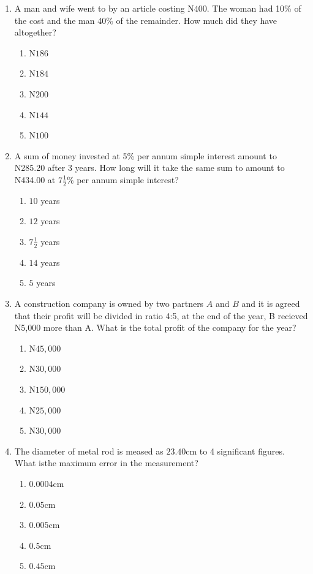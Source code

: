 \begin{multicols}{2}
\begin{enumerate}[label={\arabic*.}]
\begin{enumerate}[label={\Alph*.}]
    \end{enumerate}
\item A man and wife went to by an article costing N\(400\). The woman had 10\% of the cost and the man 40\% of the remainder. How much did they have altogether?
    \begin{enumerate}[label={\Alph*.}]
    \item N\(186\)
    \item N\(184\)
    \item N\(200\)
    \item N\(144\)
    \item N\(100\)

    \end{enumerate}
\item A sum of money invested at 5\% per annum simple interest amount to N285.20 after 3 years. How long will it take the same sum to amount to N434.00 at 7\(\frac{1}{2}\)\% per annum simple interest?
    \begin{enumerate}[label={\Alph*.}]
    \item \(10\) years
    \item \(12\) years
    \item \(7\frac{1}{2}\) years
    \item \(14\) years
    \item \(5\) years

    \end{enumerate}
\item A construction company is owned by two partners \(A\) and \(B\) and it is agreed that their profit will be divided in ratio 4:5, at the end of the year, B recieved N5,000 more than A. What is the total profit of the company for the year? 
    \begin{enumerate}[label={\Alph*.}]
    \item N\(45,000\)
    \item N\(30,000\)
    \item N\(150,000\)
    \item N\(25,000\)
    \item N\(30,000\)

    \end{enumerate}
\item The diameter of metal rod is meased as \(23.40\)cm to 4 significant figures. What isthe maximum error in the measurement?
    \begin{enumerate}[label={\Alph*.}]
    \item \(0.0004\)cm
    \item \(0.05\)cm
    \item \(0.005\)cm
    \item \(0.5\)cm
    \item \(0.45\)cm


\end{enumerate}
\end{enumerate}
\end{multicols}
